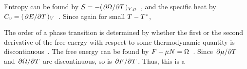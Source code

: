 {	Entropy can be found by $S = -(\pdv*{\Omega}{T})_{V, \mu}$~\cite[p.~150]{Landau}, and the specific heat by $C_v = (\pdv*{E}{T})_V$~\cite[p.~165]{Landau}.  Since
	again for small $T - T^*$,
	
	The order of a phase transition is determined by whether the first or the second derivative of the free energy with respect to some thermodynamic quantity is discontinuous~\cite{Wikipedia}.  The free energy can be found by $F - \mu N = \Omega$~\cite[p.~69]{Landau}.  Since $\pdv*{\mu}{T}$ and $\pdv*{\Omega}{T}$ are discontinuous, so is $\pdv*{F}{T}$.  Thus, this is a 
}

%
%


